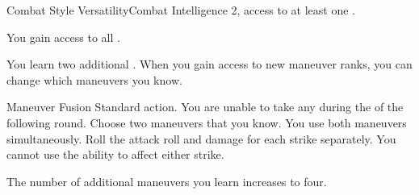   \begin{feat}{Combat Style Versatility}{Combat}
    \featpre Intelligence 2, access to at least one .

     You gain access to all .

     You learn two additional .
    When you gain access to new maneuver ranks, you can change which maneuvers you know.

    \begin{activeability}{Maneuver Fusion}
      \abilityusagetime Standard action.
      \abilitycost You are unable to take any  during the  of the following round.
      \rankline
      Choose two maneuvers that you know.
      You use both maneuvers simultaneously.
      Roll the attack roll and damage for each strike separately.
      You cannot use the  ability to affect either strike.
    \end{activeability}


     The number of additional maneuvers you learn increases to four.
  \end{feat}

